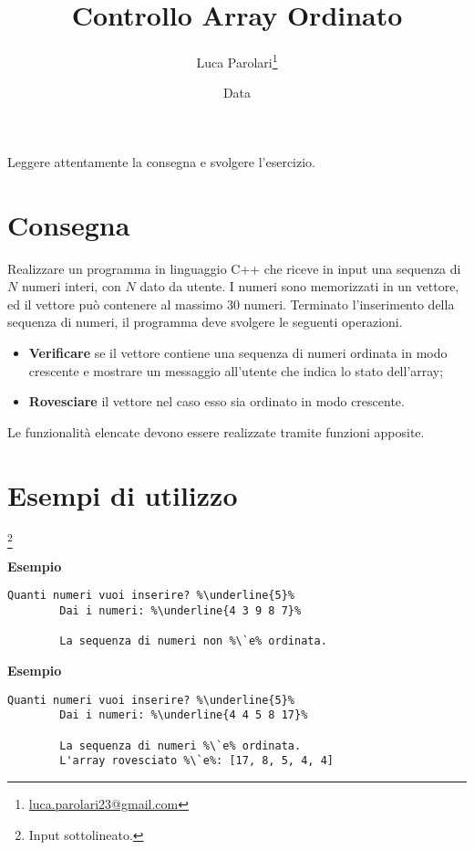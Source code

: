 \documentclass[addpoints,12pt,answers]{exam}
\author{Luca Parolari\footnote{\href{mailto:luca.parolari23@gmail.com}{luca.parolari23@gmail.com}}}
\begin{document}
    
    \title{Controllo Array Ordinato}
    \date{Data}
    
    \maketitle
    
    Leggere attentamente la consegna e svolgere l'esercizio.
    
    \section{Consegna}
    
    Realizzare un programma in linguaggio C++ che riceve in input una sequenza di $N$ numeri interi, con $N$ dato da utente. I numeri sono memorizzati in un vettore, ed il vettore può contenere al massimo $30$ numeri. Terminato l’inserimento della sequenza di numeri, il programma deve svolgere le seguenti operazioni.
    \begin{itemize}
        \item \textbf{Verificare} se il vettore contiene una sequenza di numeri ordinata in modo crescente e mostrare un messaggio all'utente che indica lo stato dell'array;
        \item \textbf{Rovesciare} il vettore nel caso esso sia ordinato in modo crescente. 
    \end{itemize}
    Le funzionalità elencate devono essere realizzate tramite funzioni apposite.
    
    \section{Esempi di utilizzo}
    \footnote{Input sottolineato.}
    
    \noindent\textbf{Esempio}
	\begin{lstlisting}[style=verbatim]
        Quanti numeri vuoi inserire? %\underline{5}%
        Dai i numeri: %\underline{4 3 9 8 7}%

        La sequenza di numeri non %\`e% ordinata.
	\end{lstlisting}

    \noindent\textbf{Esempio}
    \begin{lstlisting}[style=verbatim]
        Quanti numeri vuoi inserire? %\underline{5}%
        Dai i numeri: %\underline{4 4 5 8 17}%
		
        La sequenza di numeri %\`e% ordinata.
        L'array rovesciato %\`e%: [17, 8, 5, 4, 4]
	\end{lstlisting}
    
\end{document}
